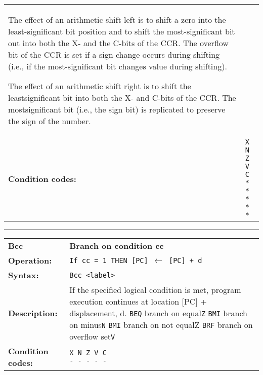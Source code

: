 \documentclass[]{article}
\newcommand{\textoverline}[1]{$\overline{\mbox{#1}}$}
\begin{document}
\begin{appendices}
\begin{tabularx}{\textwidth}{lL}
The effect of an arithmetic shift left is to shift a zero into the
least-significant bit position and to shift the most-significant bit
out into both the X- and the C-bits of the CCR. The overflow bit
of the CCR is set if a sign change occurs during shifting (i.e., if
the most-significant bit changes value during shifting).

The effect of an arithmetic shift right is to shift the leastsignificant
bit into both the X- and C-bits of the CCR. The mostsignificant
bit (i.e., the sign bit) is replicated to preserve the sign of
the number.\\
  \textbf{Condition codes:} & \texttt{X N Z V C\newline * * * * *}\\
\end{tabularx}
\newline

\newpage

\noindent\rule{10cm}{1pt}\newline %
\setlength\extrarowheight{5pt} %
\begin{tabularx}{\textwidth}{lL}
  {\Large \textbf{Bcc}} 	& {\Large \textbf{Branch on condition cc}}\\
  \textbf{Operation:} 		& \texttt{If cc = 1 THEN [PC] $\leftarrow$ [PC] + d}\\
  \textbf{Syntax:}  		& \texttt{Bcc <label>}\\
  \textbf{Description:}  	& If the specified logical condition is met, program execution
continues at location [PC] + displacement, d.\newline\newline
							  \texttt{BEQ} {} {} {} branch on equal\hfill \texttt{Z}\newline
							  \texttt{BMI} {} {} {} branch on minus\hfill \texttt{N}\newline
							  \texttt{BMI} {} {} {} branch on not equal\hfill \texttt{\textoverline{Z}}\newline
							  \texttt{BRF} {} {} {} branch on overflow set\hfill \texttt{V}\newline
							  \\
  \textbf{Condition codes:} & \texttt{X N Z V C\newline - - - - -}\\
\end{tabularx}
\newline


\end{appendices}
\end{document}
